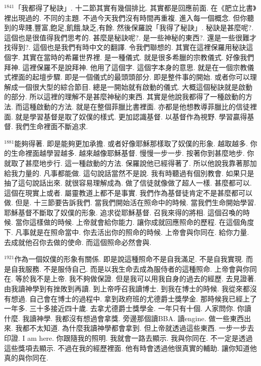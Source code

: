 \documentclass{book}
\begin{document}
$^{1841}$「我都得了秘訣」.
十二節其實有幾個排比.
其實都是回應前面.
在《肥立比書》裡出現過的.
不同的主題.
不過今天我們沒有時間再重複.
進入每一個概念.
但你聽到的卑賤,豐富,飽足,飢餓,缺乏,有餘.
然後保羅說「我得了秘訣」.
秘訣是甚麼呢?.
這個也是很值得我們思考的.
甚麼是秘訣呢?.
是一些神秘的東西?.
還是一些很難才找得到?.
這個也是我們有時中文的翻譯.
令我們聯想的.
其實在這裡保羅用秘訣這個字.
其實在當時的希羅世界裡.
是一種儀式.
就是很多希臘的宗教儀式.
好像我們拜神.
這裡保羅不是說拜神.
他用了這個字.
這個字本身的意思.
就是在一個宗教儀式裡面的起壇步驟.
即是一個儀式的最頭頭部分.
即是整件事的開始.
或者你可以理解成一個很大型的綜合節目.
總是一開始就有啟動的儀式.
大概這個秘訣就是啟動的部分.
所以這裡的理解不是甚麼神秘的東西.
其實是他說我都得了一種啟動的方法.
而這種啟動的方法.
就是在整個菲臘比書裡面.
亦都是他想教導菲臘比的信徒裡面.
就是學習基督是取了奴僕的樣式.
更加認識基督.
以基督作為視野.
學習贏得基督.
我們生命裡面不斷追求.

$^{1881}$能夠得著.
即是能夠更加承擔.
或者好像耶穌那樣取了奴僕的形象.
越取越多.
你的生命裡面越學習越多.
越來越像耶穌基督.
慢慢一步一步.
按著你到甚麼地步.
你就取了甚麼地步行.
這一種啟動的方法.
保羅說他已經得著了.
所以他說我靠著那加給我力量的.
凡事都能做.
這句說話當然不是說.
我有時聽過有個別教會.
如果只是抽了這句說話出來.
就很容易理解成為.
做了信徒就像做了超人一樣.
甚麼都可以.
這個在現實上或者.
屬靈教道上都不是事實.
我們作為基督徒肯定不是甚麼都可以做.
但是.
十三節要告訴我們.
當我們開始活在照命中的時候.
當我們生命開始學習.
耶穌基督不斷取了奴僕的形象.
追求從耶穌基督.
召我來得的將相.
這個召喚的時候.
當你這樣做的時候.
上帝就會給你能力.
讓你成就回應照命的歷程.
在這個角度下.
凡事就是在照命當中.
你去活出你的照命的時候.
上帝會與你同在.
給你力量.
去成就他召你去做的使命.
而這個照命必然會與.

$^{1921}$作為一個奴僕的形象有關係.
即是說這種照命不是自我滿足.
不是自我實現.
而是自我服務.
不是服侍自己.
而是以我生命去成為服侍者的這種照命.
上帝會與你同在.
等於我不是上帝.
我不夠做保證.
但是我可以用我自身的過去的經歷.
去見證著.
由我讀神學到有挫敗到再讀.
到上帝呼召我讀博士.
到我在博士的時候.
我從來都沒有想過.
自己會在博士的過程中.
拿到政府班的尤德爵士獎學金.
那時候我已經上了一年多.
三十多接近四十歲.
去拿尤德爵士獎學金.
一年只有十個.
人家問你.
你讀什麼.
我讀神學.
我都沒有想過會拿獎.
旁邊那個讀BBA.
讀engine.
做一些東西出來.
我都不太知道.
為什麼我讀神學都會拿到.
但上帝就透過這些東西.
一步一步去印證.
I am here.
你跟隨我的照明.
我就會一路去顯示.
我與你同在.
不一定是透過這些獎項去顯示.
不過在我的經歷裡面.
他有時會透過他很真實的輔助.
讓你知道他真的與你同在.
\end{document}
